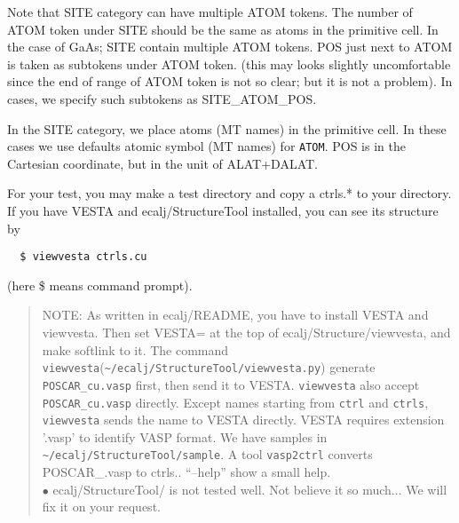 \documentclass[a4paper,10pt,epsf,fleqn]{article}
\begin{document}
Note that SITE category can have multiple ATOM tokens. The number of
ATOM token under SITE should be  the same as atoms in the primitive cell.
In the case of GaAs; SITE contain multiple ATOM tokens.
POS just next to ATOM is taken as subtokens under ATOM token. 
(this may looks slightly uncomfortable since the end of range of ATOM
 token is not so clear; but it is not a problem).
In cases, we specify such subtokens as SITE\_ATOM\_POS.

In the SITE category, we place atoms (MT names) in the primitive cell.
In these cases we use defaults atomic symbol (MT names) for \verb+ATOM+.
POS is in the Cartesian coordinate, but in the unit of ALAT+DALAT.

For your test, you may make a test directory and copy a ctrls.* to your directory.
If you have VESTA and ecalj/StructureTool installed, you can see its structure by 
\begin{verbatim}
  $ viewvesta ctrls.cu
\end{verbatim}
(here \$ means command prompt).
\begin{quote}
NOTE: As written in ecalj/README, you have to install VESTA and viewvesta. 
Then set VESTA= at the top of ecalj/Structure/viewvesta, and make softlink to it.
The command \verb+viewvesta+(\verb+~/ecalj/StructureTool/viewvesta.py+)
generate \verb+POSCAR_cu.vasp+ first, then send it to VESTA.
\verb+viewvesta+ also accept \verb+POSCAR_cu.vasp+ directly.
Except names starting from \verb+ctrl+ and \verb+ctrls+,
\verb+viewvesta+ sends the name to VESTA directly. 
VESTA requires extension '.vasp' to identify VASP format.
We have samples in \verb+~/ecalj/StructureTool/sample+.
A tool \verb+vasp2ctrl+ converts POSCAR\_\*.vasp to ctrls.\*.
``--help'' show a small help. \\
$\bullet$ ecalj/StructureTool/ is not tested well. Not believe it so
much... We will fix it on your request.
\end{quote}
\end{document}
